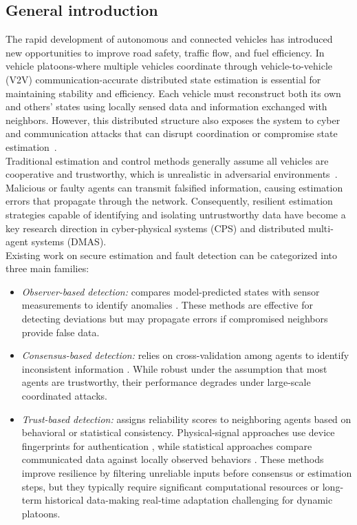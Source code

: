 \documentclass{ifacconf}
\begin{document}
\subsection{General introduction}
\vspace*{-0.3pt}
The rapid development of autonomous and connected vehicles has introduced new opportunities to improve road safety, traffic flow, and fuel efficiency. In vehicle platoons-where multiple vehicles coordinate through vehicle-to-vehicle (V2V) communication-accurate distributed state estimation is essential for maintaining stability and efficiency. Each vehicle must reconstruct both its own and others' states using locally sensed data and information exchanged with neighbors. However, this distributed structure also exposes the system to cyber and communication attacks that can disrupt coordination or compromise state estimation~\citep{Ali_book}. \\
%
Traditional estimation and control methods generally assume all vehicles are cooperative and trustworthy, which is unrealistic in adversarial environments~\citep{Shengya_HG}. Malicious or faulty agents can transmit falsified information, causing estimation errors that propagate through the network. Consequently, resilient estimation strategies capable of identifying and isolating untrustworthy data have become a key research direction in cyber-physical systems (CPS) and distributed multi-agent systems (DMAS).\\
%
Existing work on secure estimation and fault detection can be categorized into three main families:
\begin{itemize}
    \item {\it Observer-based detection:} compares model-predicted states with sensor measurements to identify anomalies \cite{Huy_LCSS,2_obs_Angelo}. These methods are effective for detecting deviations but may propagate errors if compromised neighbors provide false data.
    \item {\it Consensus-based detection:} relies on cross-validation among agents to identify inconsistent information \cite{Guitao_multi_mesure}. While robust under the assumption that most agents are trustworthy, their performance degrades under large-scale coordinated attacks.
    \item {\it Trust-based detection:} assigns reliability scores to neighboring agents based on behavioral or statistical consistency. Physical-signal approaches use device fingerprints for authentication \cite{trust_physic_connecte}, while statistical approaches compare communicated data against locally observed behaviors \cite{Wang_2021}. These methods improve resilience by filtering unreliable inputs before consensus or estimation steps, but they typically require significant computational resources or long-term historical data-making real-time adaptation challenging for dynamic platoons.
\end{itemize}
\end{document}
